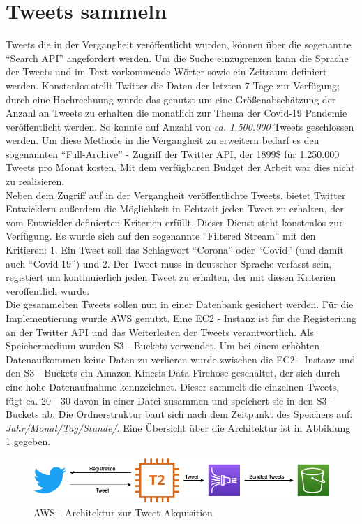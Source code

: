 \section{Tweets sammeln}
\label{sec:tweets-sammeln}
Tweets die in der Vergangheit veröffentlicht wurden, können über die sogenannte "`Search API"' angefordert werden. Um die Suche einzugrenzen kann die Sprache der Tweets und im Text vorkommende Wörter sowie ein Zeitraum definiert werden. 
Konstenlos stellt Twitter die Daten der letzten 7 Tage zur Verfügung; durch eine Hochrechnung wurde das genutzt um eine Größenabschätzung der Anzahl an Tweets zu erhalten die monatlich zur Thema der Covid-19 Pandemie veröffentlicht werden.
So konnte auf Anzahl von \textit{ca. 1.500.000} Tweets geschlossen werden. 
Um diese Methode in die Vergangheit zu erweitern bedarf es den sogenannten "`Full-Archive"' - Zugriff der Twitter API, der 1899\$ für 1.250.000 Tweets pro Monat kosten. Mit dem verfügbaren Budget der Arbeit war dies nicht zu realisieren.\\ \newline
Neben dem Zugriff auf in der Vergangheit veröffentlichte Tweets, bietet Twitter Entwicklern außerdem die Möglichkeit in Echtzeit jeden Tweet zu erhalten, der vom Entwickler definierten Kriterien erfüllt.
Dieser Dienst steht konstenlos zur Verfügung.
Es wurde sich auf den sogenannte "`Filtered Stream"' mit den Kritieren: 1. Ein Tweet soll das Schlagwort "`Corona"' oder "`Covid"' (und damit auch "`Covid-19"') und 2. Der Tweet muss in deutscher Sprache verfasst sein, registiert um kontinuierlich jeden Tweet zu erhalten, der mit diesen Kriterien veröffentlich wurde. \\
Die gesammelten Tweets sollen nun in einer Datenbank gesichert werden. 
Für die Implementierung wurde \ac{AWS}  genutzt. Eine \gls{EC2 - Instanz} ist für die Registeriung an der Twitter API und das Weiterleiten der Tweets verantwortlich. Als Speichermedium wurden \glspl{S3 - Bucket} verwendet. Um bei einem erhöhten Datenaufkommen keine Daten zu verlieren wurde zwischen die \gls{EC2 - Instanz} und den \glspl{S3 - Bucket} ein \gls{Amazon Kinesis Data Firehose} geschaltet, der sich durch eine hohe Datenaufnahme kennzeichnet. 
Dieser sammelt die einzelnen Tweets, fügt ca. 20 - 30 davon in einer Datei zusammen und speichert sie in den \glspl{S3 - Bucket} ab. 
Die Ordnerstruktur baut sich nach dem Zeitpunkt des Speichers auf: \textit{Jahr/Monat/Tag/Stunde/}.
Eine Übersicht über die Architektur ist in Abbildung \ref{fig:aws-architecture} gegeben.
\begin{figure}[h]
	\centering
	\includegraphics[width=0.7\linewidth]{images/AWS-architecture}
	\caption[]{\ac{AWS} - Architektur zur Tweet Akquisition}
	\label{fig:aws-architecture}
\end{figure}

